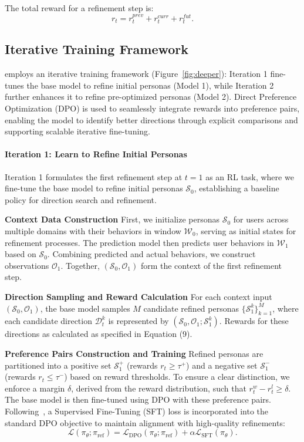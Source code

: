 The total reward for a refinement step is:
\vspace{-2mm}
\[
r_t = r_t^{prev}+ r_t^{curr}+r_t^{fut}. \tag{9}
\]

\subsection{Iterative Training Framework}
\method employs an iterative training framework (Figure~\ref{fig:deeper}): Iteration 1 fine-tunes the base model to refine initial personas (Model 1), while Iteration 2 further enhances it to refine pre-optimized personas (Model 2). Direct Preference Optimization (DPO)\cite{rafailov2024direct} is used to seamlessly integrate rewards into preference pairs, enabling the model to identify better directions through explicit comparisons and supporting scalable iterative fine-tuning.

\paragraph{Iteration 1: Learn to Refine Initial Personas}
Iteration 1 formulates the first refinement step at $t=1$ as an RL task, where we fine-tune the base model to refine initial personas $\mathcal{S}_0$, establishing a baseline policy for direction search and refinement.

\textbf{Context Data Construction}  
First, we initialize personas $\mathcal{S}_0$ for users across multiple domains with their behaviors in window $\mathcal{W}_0$, serving as initial states for refinement processes. The prediction model then predicts user behaviors in $\mathcal{W}_1$ based on $\mathcal{S}_0$. Combining predicted and actual behaviors, we construct observations $\mathcal{O}_1$. Together, $(\mathcal{S}_0, \mathcal{O}_1)$ form the context of the first refinement step.

\textbf{Direction Sampling and Reward Calculation}  
For each context input $(\mathcal{S}_0, \mathcal{O}_1)$, the base model samples $M$ candidate refined personas $\{\mathcal{S}_1^k\}_{k=1}^M$, where each candidate direction $\mathcal{D}_t^k$ is represented by $(\mathcal{S}_0, \mathcal{O}_1; \mathcal{S}_1^k)$. Rewards for these directions as calculated as specified in Equation (9).

\textbf{Preference Pairs Construction and Training}
Refined personas are partitioned into a positive set $\mathcal{S}_1^+$ (rewards $r_t \geq \tau^+$) and a negative set $\mathcal{S}_1^-$ (rewards $r_t \leq \tau^-$) based on reward thresholds. To ensure a clear distinction, we enforce a margin $\delta$, derived from the reward distribution, such that $r_t^w - r_t^l \geq \delta$. The base model is then fine-tuned using DPO with these preference pairs. Following~\cite{gui2024bonbon}, a Supervised Fine-Tuning (SFT) loss is incorporated into the standard DPO objective to maintain alignment with high-quality refinements:
\vspace{-2mm}
\[
\mathcal{L}(\pi_\theta; \pi_{\text{ref}}) = \mathcal{L}_{\text{DPO}}(\pi_\theta; \pi_{\text{ref}}) + \alpha \mathcal{L}_{\text{SFT}}(\pi_\theta). \tag{10}
\]

